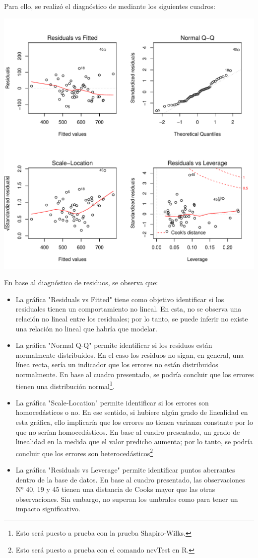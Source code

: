 \documentclass[a4paper,10pt]{article}\usepackage[]{graphicx}\usepackage[]{color}
\makeatletter
\def\maxwidth{ %
  \ifdim\Gin@nat@width>\linewidth
    \linewidth
  \else
    \Gin@nat@width
  \fi
}
\makeatother
\begin{document}
Para ello, se realizó el diagnóstico de mediante los siguientes cuadros:


\includegraphics[width=\maxwidth]{figure/unnamed-chunk-4-1} 


En base al diagnóstico de residuos, se observa que:
\begin{itemize}
  \item La gráfica "Residuals vs Fitted" tiene como objetivo identificar si los residuales tienen un comportamiento no lineal. En esta, no se observa una relación no lineal entre los residuales; por lo tanto, se puede inferir no existe una relación no lineal que habría que modelar.
  \item La gráfica "Normal Q-Q" permite identificar si los residuos están normalmente distribuidos. En el caso los residuos no sigan, en general, una línea recta, sería un indicador que los errores no están distribuidos normalmente. En base al cuadro presentado, se podría concluir que los errores tienen una distribución normal\footnote{Esto será puesto a prueba con la prueba Shapiro-Wilks.}.
  \item La gráfica "Scale-Location" permite identificar si los errores son homocedásticos o no. En ese sentido, si hubiere algún grado de linealidad en esta gráfica, ello implicaría que los errores no tienen varianza constante por lo que no serían homocedásticos. En base al cuadro presentado, un grado de linealidad en la medida que el valor predicho aumenta; por lo tanto, se podría concluir que los errores son heterocedásticos\footnote{Esto será puesto a prueba con el comando ncvTest en R.}
  \item La gráfica "Residuals vs Leverage" permite identificar puntos aberrantes dentro de la base de datos. En base al cuadro presentado, las observaciones N° 40, 19 y 45 tienen una distancia de Cooks mayor que las otras observaciones. Sin embargo, no superan los umbrales como para tener un impacto significativo.
\end{itemize}
\end{document}
